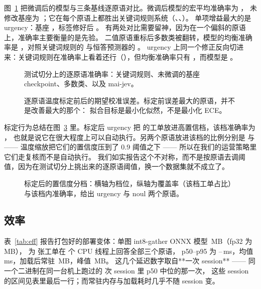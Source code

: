 \documentclass[11pt,a4paper]{article}
\begin{document}
图~\ref{fig:acc} 把微调后的模型与三条基线逐原语对比。微调后模型的宏平均准确率为 \MacroAcc{}，
未修改基座为 \OrigAccMacro{}；它在每个原语上都胜出关键词规则系统（\RulesAccChoice{}、\RulesAccScore{}、\RulesAccNoul{}）。
单项增益最大的是 urgency：基座 \OrigAccScore{}，标签修好后 \AccScore{}。
有两处对比需要留神，因为在一个偏斜的原语上，准确率主要衡量的是先验。
二值原语重标后多数类被翻转，模型的均衡准确率是 \BAccNoul{}，对照关键词规则的 \RulesBAccNoul{} 与恒答预测器的 \MajAccNoul{}。
urgency 上同一个修正反向切进来：关键词规则在准确率上看着还行（\RulesAccScore{}），但均衡准确率只有 \RulesBAccScore{}，而模型是 \BAccScore{}。

\begin{figure}[t]
\centering

\caption{测试切分上的逐原语准确率：关键词规则、未微调的基座 checkpoint、多数类、以及 mai-jev。}
\label{fig:acc}
\end{figure}

\begin{figure}[t]
\centering

\caption{逐原语温度标定前后的期望校准误差。标定前误差最大的原语，并不是改善最大的那个：
拟合目标是最小化似然，不是最小化 ECE。}
\label{fig:ece}
\end{figure}

标定行为总结在图~\ref{fig:tiers} 里。标定后 urgency 把 \AutoCovScore{} 的工单放进高置信档，该档准确率为 \AutoAccScore{}，
也就是说它在很大程度上可以自动执行。另两个原语放进该档的比例分别是 \AutoCovChoice{} 与 \AutoCovNoul{} ——
温度缩放把它们的置信度压到了 \num{0.9} 阈值之下 —— 所以在我们的运营策略里它们走复核而不是自动执行。
我们如实报告这个不对称，而不是按原语去调阈值，因为在测试切分上挑出来的逐原语阈值，换一个数据集就不成立了。

\begin{figure}[t]
\centering

\caption{标定后的置信度分档：横轴为档位，纵轴为覆盖率（该档工单占比）与该档内准确率，给出 urgency 与 noul 两个原语。}
\label{fig:tiers}
\end{figure}

\subsection{效率}

\label{sec:eff}

表~\ref{tab:eff} 报告打包好的部署变体：单图 int8-gather ONNX 模型 \ModelMb\,MB（fp32 为 \FpThreeTwoMb\,MB），
为 \BenchN{} 张工单在 \BenchThreads{} 个 CPU 线程上回答全部三个原语，
p50--p95 为 \LatPFiveZero--\LatPNineFive\,ms，均值 \LatMean\,ms，加载后常驻 \RssMb\,MB，峰值 \RssPeakMb\,MB。
这几个延迟数字取自**一次 session** —— 同一个二进制在同一台机上跑过的 \LatSessions{} 次 session 里 p50 中位的那一次，
这些 session 的区间见表里最后一行；而常驻内存与加载耗时几乎不随 session 变。
\end{document}
